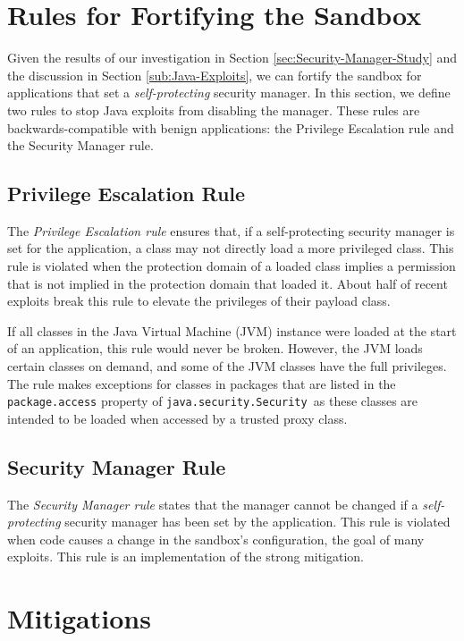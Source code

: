 \documentclass{sig-alternate}
\begin{document}
\section{Rules for Fortifying the Sandbox}\label{sec:Rules-for-Fortifying}

Given the results of our investigation in Section \ref{sec:Security-Manager-Study}
and the discussion in Section \ref{sub:Java-Exploits}, we can fortify
the sandbox for applications that set a\emph{ self-protecting} security
manager. In this section, we define two rules to stop Java exploits
from disabling the manager. These rules are backwards-compatible with
benign applications: the Privilege Escalation rule and the Security
Manager rule. 


\subsection{Privilege Escalation Rule}

The \textit{Privilege Escalation rule} ensures that, if a self-protecting
security manager is set for the application, a class may not directly
load a more privileged class. This rule is violated when the protection
domain of a loaded class implies a permission that is not implied
in the protection domain that loaded it. About half of recent exploits
break this rule to elevate the privileges of their payload class.

If all classes in the Java Virtual Machine (JVM) instance were loaded
at the start of an application, this rule would never be broken. However,
the JVM loads certain classes on demand, and some of the JVM classes
have the full privileges. The rule makes exceptions for classes in
packages that are listed in the \texttt{package.access} property of
\texttt{java.security.Security }as these classes are intended to be
loaded when accessed by a trusted proxy class. 


\subsection{Security Manager Rule}

The \textit{Security Manager rule} states that the manager cannot
be changed if a \emph{self-protecting} security manager has been set
by the application. This rule is violated when code causes a change
in the sandbox's configuration, the goal of many exploits. This rule
is an implementation of the strong mitigation.


\section{Mitigations}\label{sec:Mitigations}
\end{document}
